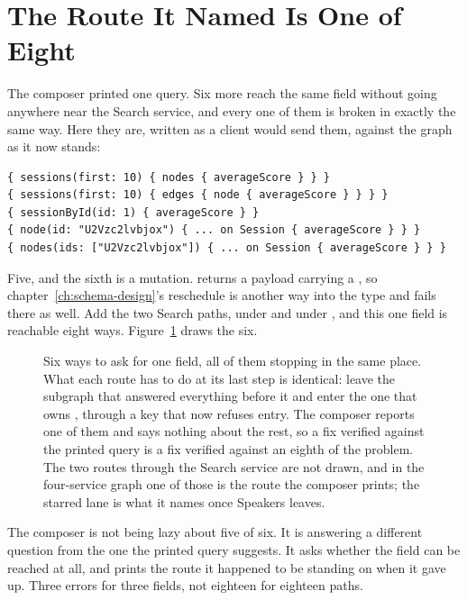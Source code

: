 \section{The Route It Named Is One of Eight}
\label{sec:ch15-the-route-it-named-is-one-of-six}

%
The composer printed one query. Six more reach the same field without going
anywhere near the Search service, and every one of them is broken in exactly
the same way. Here they are, written as a client would send them, against the
graph as it now stands:

\begin{verbatim}
{ sessions(first: 10) { nodes { averageScore } } }
{ sessions(first: 10) { edges { node { averageScore } } } }
{ sessionById(id: 1) { averageScore } }
{ node(id: "U2Vzc2lvbjox") { ... on Session { averageScore } } }
{ nodes(ids: ["U2Vzc2lvbjox"]) { ... on Session { averageScore } } }
\end{verbatim}

%
Five, and the sixth is a mutation.  returns a payload
carrying a , so chapter~\ref{ch:schema-design}'s reschedule is
another way into the type and fails there as well. Add the two Search paths,
under  and under , and this one field is reachable
eight ways. Figure~\ref{fig:ch15-one-route-of-six} draws the six.

\begin{figure}[htbp]
  \centering
  
  \caption{Six ways to ask for one field, all of them stopping in the same
  place. What each route has to do at its last step is identical: leave the
  subgraph that answered everything before it and enter the one that owns
  , through a key that now refuses entry. The composer
  reports one of them and says nothing about the rest, so a fix verified
  against the printed query is a fix verified against an eighth of the problem.
  The two routes through the Search service are not drawn, and in the
  four-service graph one of those is the route the composer prints; the starred
  lane is what it names once Speakers leaves.}
  \label{fig:ch15-one-route-of-six}
\end{figure}

%
The composer is not being lazy about five of six. It is answering a different
question from the one the printed query suggests. It asks whether the field can
be reached at all, and prints the route it happened to be standing on when it
gave up. Three errors for three fields, not eighteen for eighteen paths.

